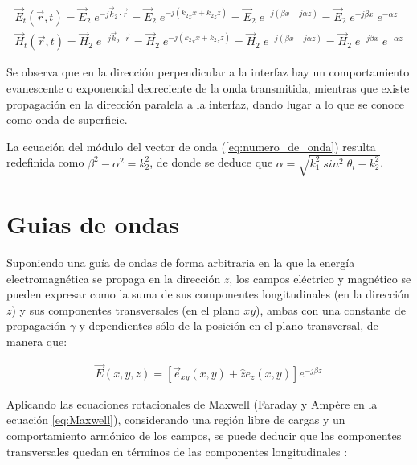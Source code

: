 \begin{subequations}
	\begin{align}
		\vec{E}_t (\vec{r},t) = \vec{E}_2 \; e^{-j \vec{k}_2 \cdot \vec{r}} = \vec{E}_2 \; e^{-j({k_2}_x x + {k_2}_z z)} = \vec{E}_2 \; e^{-j(\beta x - j\alpha z)} = \vec{E}_2 \; e^{-j\beta x} \; e^{- \alpha z}\\
		\vec{H}_t (\vec{r},t) = \vec{H}_2 \; e^{-j \vec{k}_2 \cdot \vec{r}} = \vec{H}_2 \; e^{-j({k_2}_x x + {k_2}_z z)} = \vec{H}_2 \; e^{-j(\beta x - j\alpha z)} = \vec{H}_2 \; e^{-j\beta x} \; e^{- \alpha z}
	\end{align}
\end{subequations}

Se observa que en la dirección perpendicular a la interfaz hay un comportamiento evanescente o exponencial decreciente de la onda transmitida, mientras que existe propagación en la dirección paralela a la interfaz, dando lugar a lo que se conoce como onda de superficie.

La ecuación del módulo del vector de onda (\ref{eq:numero_de_onda}) resulta redefinida como $\beta^2 - \alpha^2 = k_2^2$, de donde se deduce que $\alpha = \sqrt{k_1^2\;sin^2\;\theta_i - k_2^2}$.



\section{Guias de ondas}
\label{subsec_guias_de_ondas}

Suponiendo una guía de ondas de forma arbitraria en la que la energía electromagnética se propaga en la dirección $z$, los campos eléctrico y magnético se pueden expresar como la suma de sus componentes longitudinales (en la dirección $z$) y sus componentes transversales (en el plano $xy$), ambas con una constante de propagación $\gamma$ y dependientes sólo de la posición en el plano transversal, de manera que:

\begin{align}
	\vec{E}(x,y,z) = \left[ \vec{e}_{xy}(x,y) + \hat{z} e_z(x,y) \right] e^{-j\beta z}
\end{align}

Aplicando las ecuaciones rotacionales de Maxwell (Faraday y Ampère en la ecuación \ref{eq:Maxwell}), considerando una región libre de cargas y un comportamiento armónico de los campos, se puede deducir que las componentes transversales quedan en términos de las componentes longitudinales \cite{Fernandez:Electromag}:

